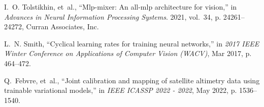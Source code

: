 \begin{bibunit}
\begin{thebibliography}{10}
I.~O. Tolstikhin, et~al.,
\newblock ``Mlp-mixer: An all-mlp architecture for vision,''
\newblock in {\em Advances in Neural Information Processing Systems}. 2021,
  vol.~34, p. 24261–24272, Curran Associates, Inc.

L.~N. Smith,
\newblock ``Cyclical learning rates for training neural networks,''
\newblock in {\em 2017 IEEE Winter Conference on Applications of Computer
  Vision (WACV)}, Mar 2017, p. 464–472.

Q.~Febvre, et~al.,
\newblock ``Joint calibration and mapping of satellite altimetry data using
  trainable variational models,''
\newblock in {\em IEEE ICASSP 2022 - 2022}, May 2022, p. 1536–1540.

\end{thebibliography}


\end{bibunit}



% 



